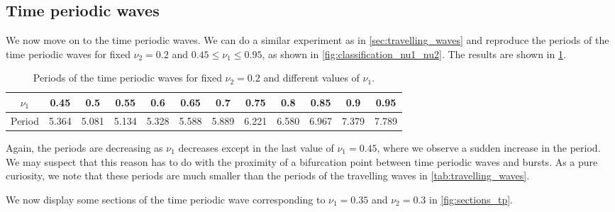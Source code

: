 \documentclass[twoside]{article}
\begin{document}
\subsection{Time periodic waves}\label{sec:time_periodic_waves}
We now move on to the time periodic waves. We can do a similar experiment as in \cref{sec:travelling_waves} and reproduce the periods of the time periodic waves for fixed $\nu_2=0.2$ and $0.45\leq \nu_1\leq 0.95$, as shown in \cref{fig:classification_nu1_nu2}. The results are shown in \cref{tab:time_periodic_waves}.

\begin{table}[ht]
  \centering
  \begin{tabular}{|c||ccccccccccc|}
    \hline
    $\nu_1$ & 0.45  & 0.5   & 0.55  & 0.6   & 0.65  & 0.7   & 0.75  & 0.8   & 0.85  & 0.9   & 0.95  \\ \hline
    Period  & 5.364 & 5.081 & 5.134 & 5.328 & 5.588 & 5.889 & 6.221 & 6.580 & 6.967 & 7.379 & 7.789 \\
    \hline
  \end{tabular}
  \caption{Periods of the time periodic waves for fixed $\nu_2=0.2$ and different values of $\nu_1$.}
  \label{tab:time_periodic_waves}
\end{table}
Again, the periods are decreasing as $\nu_1$ decreases except in the last value of $\nu_1=0.45$, where we observe a sudden increase in the period. We may suspect that this reason has to do with the proximity of a bifurcation point between time periodic waves and bursts. As a pure curiosity, we note that these periods are much smaller than the periods of the travelling waves in \cref{tab:travelling_waves}.

We now display some sections of the time periodic wave corresponding to $\nu_1=0.35$ and $\nu_2=0.3$ in \cref{fig:sections_tp}.
\end{document}
